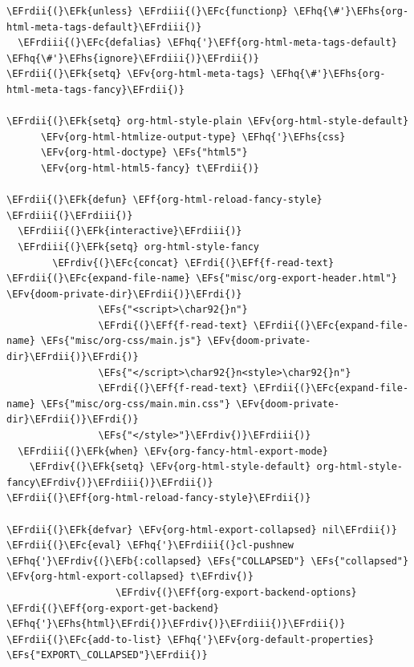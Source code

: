 \documentclass{scrartcl}
\newcommand{\EFk}[1]{\textcolor{EFk}{#1}} %
\newcommand{\EFs}[1]{\textcolor{EFs}{#1}} %
\newcommand{\EFb}[1]{\textcolor{EFb}{#1}} %
\newcommand{\EFc}[1]{\textcolor{EFc}{#1}} %
\newcommand{\EFv}[1]{\textcolor{EFv}{#1}} %
\newcommand{\EFf}[1]{\textcolor{EFf}{#1}} %
\newcommand{\EFhq}[1]{#1} %
\newcommand{\EFhs}[1]{#1} %
\newcommand{\EFrdi}[1]{#1} %
\newcommand{\EFrdii}[1]{#1} %
\newcommand{\EFrdiii}[1]{#1} %
\newcommand{\EFrdiv}[1]{#1} %
\begin{document}
\begin{Code}
\begin{Verbatim}[]
\EFrdii{(}\EFk{unless} \EFrdiii{(}\EFc{functionp} \EFhq{\#'}\EFhs{org-html-meta-tags-default}\EFrdiii{)}
  \EFrdiii{(}\EFc{defalias} \EFhq{'}\EFf{org-html-meta-tags-default} \EFhq{\#'}\EFhs{ignore}\EFrdiii{)}\EFrdii{)}
\EFrdii{(}\EFk{setq} \EFv{org-html-meta-tags} \EFhq{\#'}\EFhs{org-html-meta-tags-fancy}\EFrdii{)}

\EFrdii{(}\EFk{setq} org-html-style-plain \EFv{org-html-style-default}
      \EFv{org-html-htmlize-output-type} \EFhq{'}\EFhs{css}
      \EFv{org-html-doctype} \EFs{"html5"}
      \EFv{org-html-html5-fancy} t\EFrdii{)}

\EFrdii{(}\EFk{defun} \EFf{org-html-reload-fancy-style} \EFrdiii{(}\EFrdiii{)}
  \EFrdiii{(}\EFk{interactive}\EFrdiii{)}
  \EFrdiii{(}\EFk{setq} org-html-style-fancy
        \EFrdiv{(}\EFc{concat} \EFrdi{(}\EFf{f-read-text} \EFrdii{(}\EFc{expand-file-name} \EFs{"misc/org-export-header.html"} \EFv{doom-private-dir}\EFrdii{)}\EFrdi{)}
                \EFs{"<script>\char92{}n"}
                \EFrdi{(}\EFf{f-read-text} \EFrdii{(}\EFc{expand-file-name} \EFs{"misc/org-css/main.js"} \EFv{doom-private-dir}\EFrdii{)}\EFrdi{)}
                \EFs{"</script>\char92{}n<style>\char92{}n"}
                \EFrdi{(}\EFf{f-read-text} \EFrdii{(}\EFc{expand-file-name} \EFs{"misc/org-css/main.min.css"} \EFv{doom-private-dir}\EFrdii{)}\EFrdi{)}
                \EFs{"</style>"}\EFrdiv{)}\EFrdiii{)}
  \EFrdiii{(}\EFk{when} \EFv{org-fancy-html-export-mode}
    \EFrdiv{(}\EFk{setq} \EFv{org-html-style-default} org-html-style-fancy\EFrdiv{)}\EFrdiii{)}\EFrdii{)}
\EFrdii{(}\EFf{org-html-reload-fancy-style}\EFrdii{)}

\EFrdii{(}\EFk{defvar} \EFv{org-html-export-collapsed} nil\EFrdii{)}
\EFrdii{(}\EFc{eval} \EFhq{'}\EFrdiii{(}cl-pushnew \EFhq{'}\EFrdiv{(}\EFb{:collapsed} \EFs{"COLLAPSED"} \EFs{"collapsed"} \EFv{org-html-export-collapsed} t\EFrdiv{)}
                   \EFrdiv{(}\EFf{org-export-backend-options} \EFrdi{(}\EFf{org-export-get-backend} \EFhq{'}\EFhs{html}\EFrdi{)}\EFrdiv{)}\EFrdiii{)}\EFrdii{)}
\EFrdii{(}\EFc{add-to-list} \EFhq{'}\EFv{org-default-properties} \EFs{"EXPORT\_COLLAPSED"}\EFrdii{)}


\end{Verbatim}
\end{Code}
\end{document}
